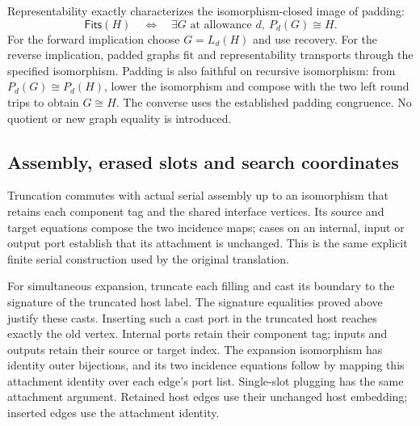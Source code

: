 
Representability exactly characterizes the isomorphism-closed image of padding:
\[
 \mathsf{Fits}(H)\quad\Longleftrightarrow\quad
 \exists G\text{ at allowance }d,\ P_d(G)\cong H.
\]
For the forward implication choose $G=L_d(H)$ and use recovery. For the reverse
implication, padded graphs fit and representability transports through the
specified isomorphism. Padding is also faithful on recursive isomorphism:
from $P_d(G)\cong P_d(H)$, lower the isomorphism and compose with the two left
round trips to obtain $G\cong H$. The converse uses the established padding
congruence. No quotient or new graph equality is introduced.




\subsection{Assembly, erased slots and search coordinates}

Truncation commutes with actual serial assembly up to an isomorphism
that retains each component tag and the shared interface vertices. Its source
and target equations compose the two incidence maps; cases on an internal,
input or output port establish that its attachment is unchanged. This is the
same explicit finite serial construction used by the original translation.


For simultaneous expansion, truncate each filling and cast its boundary
to the signature of the truncated host label. The signature equalities proved
above justify these casts. Inserting such a cast port in the truncated host
reaches exactly the old vertex. Internal ports retain their component tag;
inputs and outputs retain their source or target index. The expansion
isomorphism has identity outer bijections, and its two incidence equations
follow by mapping this attachment identity over each edge's port list.
Single-slot plugging has the same attachment argument. Retained host edges
use their unchanged host embedding; inserted edges use the attachment identity.

